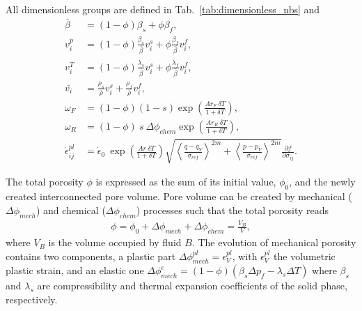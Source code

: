 \documentclass[]{scrreprt}
\begin{document}
All dimensionless groups are defined in Tab.~\ref{tab:dimensionless_nbs} and
\begin{align*}
  \bar{\beta} &= (1-\phi)\beta_s + \phi\beta_f, \\
  v_i^p &= (1-\phi)\frac{\beta_s}{\bar{\beta}} v_i^s + 
    \phi\frac{\beta_f}{\bar{\beta}}v_i^f, \\
  v^T_i &= (1-\phi)\frac{\bar{\lambda}_s}{\bar{\beta}} v_i^s + 
    \phi\frac{\bar{\lambda}_f}{\bar{\beta}} v_i^f,\\
  \bar{v_i} &= \frac{\rho_s}{\bar{\rho}} v_i^s + \frac{\rho_f}{\bar{\rho}} v_i^f, \\
  \omega_F &= (1-\phi)(1-s)\exp\left(\frac{Ar_F \: \delta T}{1 + \delta T}
  \right), \\
  \omega_R &= (1-\phi)\:s\:\Delta \phi_{chem}\exp\left(\frac{Ar_R \: \delta
  T}{1 + \delta T} \right), \\
  \dot{\epsilon}^{pl}_{ij} &= \dot \epsilon_0 \: \exp\left( \frac{Ar \: \delta
  T}{1 + \delta T}\right) \sqrt{ \left\langle\frac{q -
  q_Y}{\sigma_{ref}}\right\rangle^{2m} + \left\langle\frac{p
  - p_Y}{\sigma_{ref}}\right\rangle^{2m}} \frac{\partial f}{\partial
    \sigma_{ij}}.
\end{align*}



The total porosity $\phi$ is expressed as the sum of its initial value, $\phi_0$,
and the newly created interconnected pore volume. Pore volume can be created
by mechanical ($\Delta\phi_{mech}$) and chemical ($\Delta \phi_{chem}$)
processes such that the total porosity reads
\begin{eqnarray}
    \label{eq:porosity}
    \phi = \phi_0 + \Delta\phi_{mech} + \Delta\phi_{chem} = \frac{V_{B}}{V},
\end{eqnarray}
where $V_B$ is the volume occupied by fluid $B$.  The evolution of mechanical
porosity contains two components, a plastic part $\Delta
\phi^{pl}_{mech}=\epsilon^{pl}_V$, with $\epsilon^{pl}_V$ the volumetric plastic strain, and an
elastic one $\Delta \phi^{e}_{mech}=(1-\phi)\left( \beta_s \Delta p_f -
\lambda_s \Delta T \right)$
where $\beta_s$ and $\lambda_s$ are compressibility and
thermal expansion coefficients of the solid phase, respectively.
\end{document}
